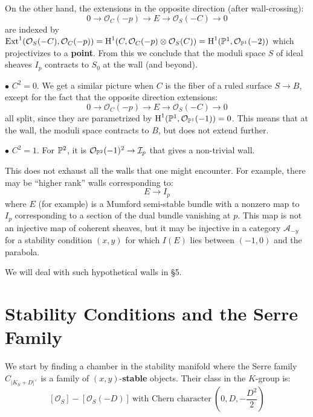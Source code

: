 \documentclass{amsart}
\begin{document}
\medskip

On the other hand, the extensions in the opposite direction (after wall-crossing): 
\[ 0 \rightarrow  {\mathcal O}_C(-p) \rightarrow E \rightarrow  {\mathcal O}_S(-C) \rightarrow 0 \] 
are indexed by
$ \mbox{Ext}^1({\mathcal O}_S(-C), {\mathcal O}_C(-p)) = \mbox{H}^1(C, {\mathcal O}_C(-p) \otimes {\mathcal O}_S(C)) = \mbox{H}^1({\mathbb P}^1, {\mathcal O}_{{\mathbb P}^1}(-2))$ 
which projectivizes to a {\bf point}. From this we conclude that
the moduli space $S$ of ideal sheaves $I_p$ contracts to $S_0$ at the wall (and beyond). 

\medskip

$\bullet$ $C^2 = 0$. We get a similar picture when $C$ is the fiber of a ruled surface $S \rightarrow B$, 
except for the fact that the opposite direction extensions: 
\[ 0 \rightarrow  {\mathcal O}_C(-p) \rightarrow E \rightarrow  {\mathcal O}_S(-C) \rightarrow 0 \] 
all split, since they are parametrized by $\mbox{H}^1({\mathbb P}^1, {\mathcal O}_{{\mathbb P}^1}(-1)) = 0$. This means 
that at the wall, the moduli space contracts to $B$, but does not extend further.  

\medskip

$\bullet$ $C^2 = 1$. For  ${\mathbb P}^2$, it is ${\mathcal O}_{{\mathbb P}^2}(-1)^2 \rightarrow {\mathcal I}_p$ that gives a non-trivial wall.  

\medskip

 This does not exhaust all the walls that one might encounter. 
For example, there may be ``higher rank'' walls corresponding to: 
\[ E \rightarrow I_p \] 
where $E$ (for example) is a Mumford semi-stable bundle with a nonzero map to $I_p$ corresponding to a section of the dual bundle
vanishing at $p$. This map is not an injective map of coherent sheaves, but it may be injective 
in a category ${\mathcal A}_{-y}$ for a stability condition $(x,y)$ for which $I(E)$ lies between $(-1,0)$ and the parabola.

\medskip

We will deal with such hypothetical walls  in \S 5. 

\medskip

\section{Stability Conditions and the Serre Family} 

We start by finding a chamber in the stability manifold where the Serre family
$C_{|K_S + D|^\vee}$
is a family of $(x,y)$-{\bf stable} objects. Their class in the $K$-group is: 
\[ [{\mathcal O}_S] - [{\mathcal O}_S(-D)] \ \mbox{with Chern character} \ \left(0, D, -\frac{D^2}2 \right) \] 
\end{document}
